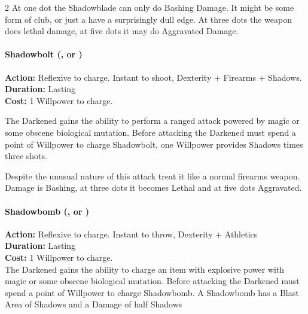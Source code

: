 \begin{multicols}{2}
At one dot the Shadowblade can only do Bashing Damage. It might be some form of club, or just a have a surprisingly dull edge. At three dots the weapon does lethal damage, at five dots it may do Aggravated Damage.\\

\paragraph*{Shadowbolt (\textbullet, \textbullet\textbullet\textbullet or \textbullet\textbullet\textbullet\textbullet\textbullet)} 

\noindent \textbf{Action:} Reflexive to charge. Instant to shoot, Dexterity + Firearms + Shadows.\\

\noindent \textbf{Duration:} Lasting \\

\noindent \textbf{Cost:} 1 Willpower to charge.

The Darkened gains the ability to perform a ranged attack powered by magic or some obscene biological mutation. Before attacking the Darkened must spend a point of Willpower to charge Shadowbolt, one Willpower provides Shadows times three shots.

Despite the unusual nature of this attack treat it like a normal firearms weapon. Damage is Bashing, at three dots it becomes Lethal and at five dots Aggravated.\\

\paragraph*{Shadowbomb (\textbullet, \textbullet\textbullet\textbullet or \textbullet\textbullet\textbullet\textbullet\textbullet)}

\noindent \textbf{Action:} Reflexive to charge. Instant to throw, Dexterity + Athletics\\

\noindent \textbf{Duration:} Lasting \\

\noindent \textbf{Cost:} 1 Willpower to charge.\\

\noindent The Darkened gains the ability to charge an item with explosive power with magic or some obscene biological mutation. Before attacking the Darkened must spend a point of Willpower to charge Shadowbomb. A Shadowbomb has a Blast Area of Shadows and a Damage of half Shadows


\end{multicols}
